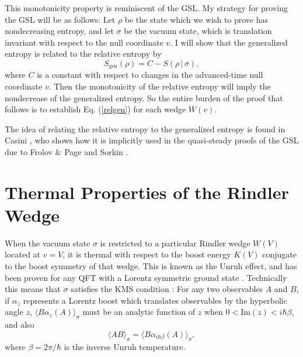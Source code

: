\documentclass{article}
\begin{document}
This monotonicity property is reminiscent of the GSL.  My strategy for proving the GSL will be as follows: Let $\rho$ be the state which we wish to prove has nondecreasing entropy, and let $\sigma$ be the vacuum state, which is translation invariant with respect to the null coordinate $v$.  I will show that the generalized entropy is related to the relative entropy by
\begin{equation}\label{relgen}
S_\mathrm{gen}(\rho) = C - S(\rho\,|\,\sigma),
\end{equation}
where $C$ is a constant with respect to changes in the advanced-time null coordinate $v$.  Then the monotonicity of the relative entropy will imply the nondecrease of the generalized entropy.  So the entire burden of the proof that follows is to establish Eq. (\ref{relgen}) for each wedge $W(v)$.

The idea of relating the relative entropy to the generalized entropy is found in Casini \cite{casini08}, who shows how it is implicitly used in the quasi-steady proofs of the GSL due to Frolov \& Page \cite{FP93} and Sorkin \cite{sorkin98}.

\section{Thermal Properties of the Rindler Wedge}\label{thermal}

When the vacuum state $\sigma$ is restricted to a particular Rindler wedge $W(V)$ located at $v = V$, it is thermal with respect to the boost energy $K(V)$ conjugate to the boost symmetry of that wedge.  This is known as the Unruh effect, and has been proven for any QFT with a Lorentz symmetric ground state \cite{BW76}.  Technically this means that $\sigma$ satisfies the KMS condition \cite{KMS}: For any two observables $A$ and $B$, if $\alpha_{z}$ represents a Lorentz boost which translates observables by the hyperbolic angle $z$, $\langle B \alpha_{z}(A) \rangle_{\sigma}$ must be an analytic function of $z$ when $0 < \textrm{Im}(z) < i \hbar \beta$, and also
\begin{equation}
\langle AB \rangle_{\sigma} = \langle B \alpha_{i \hbar \beta}(A) \rangle_{\sigma},
\end{equation}
where $\beta = 2\pi / \hbar$ is the inverse Unruh temperature.
\end{document}
